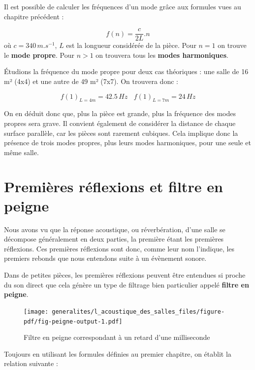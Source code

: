\documentclass[
  letterpaper,
  DIV=11,
  numbers=noendperiod]{scrreprt}
\begin{document}
Il est possible de calculer les fréquences d'un mode grâce aux formules
vues au chapitre précédent :

\[f(n) = \frac{c}{2L}.n\] où \(c=340\,m.s^{-1}\), \(L\) est la longueur
considérée de la pièce. Pour \(n=1\) on trouve le \textbf{mode propre}.
Pour \(n>1\) on trouvera tous les \textbf{modes harmoniques}.

Étudions la fréquence du mode propre pour deux cas théoriques : une
salle de 16 m² (4x4) et une autre de 49 m² (7x7). On trouvera donc :

\[f(1)_{L=4m} = 42.5 \,Hz \>\>\>\> f(1)_{L=7m} = 24 \,Hz\]

On en déduit donc que, plus la pièce est grande, plus la fréquence des
modes propres sera grave. Il convient également de considérer la
distance de chaque surface parallèle, car les pièces sont rarement
cubiques. Cela implique donc la présence de trois modes propres, plus
leurs modes harmoniques, pour une seule et même salle.

\hypertarget{premiuxe8res-ruxe9flexions-et-filtre-en-peigne}{%
\section{Premières réflexions et filtre en
peigne}\label{premiuxe8res-ruxe9flexions-et-filtre-en-peigne}}

Nous avons vu que la réponse acoustique, ou réverbération, d'une salle
se décompose généralement en deux parties, la première étant les
premières réflexions. Ces premières réflexions sont donc, comme leur nom
l'indique, les premiers rebonds que nous entendons suite à un évènement
sonore.

Dans de petites pièces, les premières réflexions peuvent être entendues
si proche du son direct que cela génère un type de filtrage bien
particulier appelé \textbf{filtre en peigne}.

\begin{figure}

{\centering \texttt{[image: generalites/l\_acoustique\_des\_salles\_files/figure-pdf/fig-peigne-output-1.pdf]}

}

\caption{\label{fig-peigne}Filtre en peigne correspondant à un retard
d'une milliseconde}

\end{figure}

Toujours en utilisant les formules définies au premier chapitre, on
établit la relation suivante :
\end{document}
